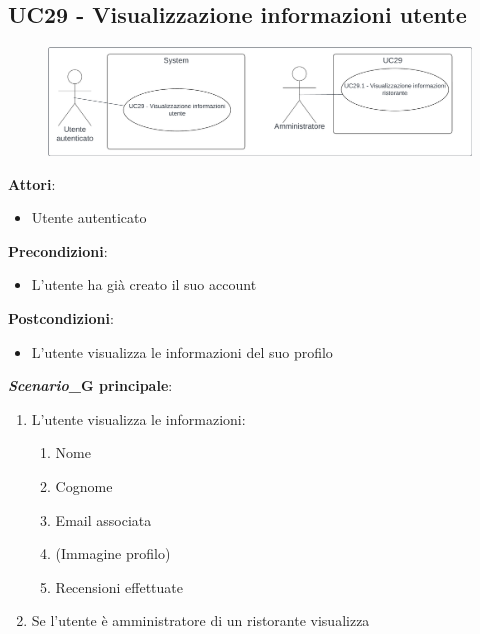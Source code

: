 \subsection{UC29 - Visualizzazione informazioni utente}\label{usecase:29}
\begin{figure}[H]
    \centering
    \includegraphics[width=0.9\linewidth]{ucd/UCD29.png}
\end{figure}
\textbf{Attori}:
\begin{itemize}
    \item Utente autenticato
\end{itemize}
\textbf{Precondizioni}:
\begin{itemize}
    \item L'utente ha già creato il suo account
\end{itemize}
\textbf{Postcondizioni}:
\begin{itemize}
    \item L'utente visualizza le informazioni del suo profilo
\end{itemize}
\textbf{\textit{Scenario}_G principale}:
\begin{enumerate}
    \item L'utente visualizza le informazioni:
    \begin{enumerate}
        \item Nome
        \item Cognome
        \item Email associata
        \item (Immagine profilo)
        \item Recensioni effettuate
    \end{enumerate}
    \item Se l'utente è amministratore di un ristorante visualizza 
\end{enumerate}